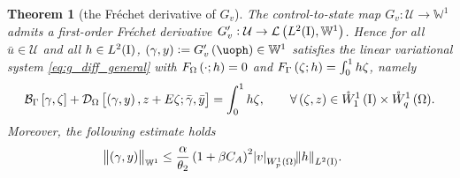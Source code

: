 \documentclass[final]{siamltex}
\newtheorem{thm}[theorem]{Theorem}
\begin{document}
\begin{thm}[the Fr\'echet derivative of $G_v$]\label{thm:g_diff_u} 
The control-to-state map $G_v:{\mathcal{U}} \to {\mathbb{W}}^1$ 
admits a first-order Fr\'echet derivative  
$G_v' : {\mathcal{U}} \rightarrow \mathcal{L}\del{L^2({\text{\rm I}}), {\mathbb{W}}^1}$. 
Hence for all ${\bar{u}} \in {\mathcal{U}}$ and 
all $h \in L^2({\text{\rm I}})$, $\del{\gamma, y} :=  G_v'\del\uoph \in {\mathbb{W}}^1$ satisfies the linear variational system \eqref{eq:g_diff_general} with $F_\Omega\del{\cdot;h} = 0$ and $F_\Gamma\del{\zeta;h} = \int_0^1 h \zeta$, namely
	\begin{equation} \label{eq:g_diff_u}
		{{\mathcal{B}}_\Gamma}\sbr{\gamma, \zeta} + {{\mathcal{D}}_\Omega}\sbr{\del{\gamma, y}, z+ E\zeta; {\bar{\gamma}}, {\bar{y}}} = \int_0^1 h \zeta, 
			\quad\quad \forall \del{\zeta, z} \in {{\mathring{W}^{1}_{1}\del{{\text{\rm I}}}}} \times {{\mathring{W}^{1}_{q}\del{\Omega}}}.
	\end{equation}
Moreover, the following estimate holds
	\begin{align}\label{eq:g_diff_u_estimate}
		\norm{\del{\gamma,y}}_{{\mathbb{W}}^1} 
			&\le \frac{\alpha}{\theta_2} \del{1+\beta C_A}^2{\abs{{v}}_{{W^{{1}}_{{p}}\del{{\Omega}}}}}{\norm{{h}}_{{L^2\del{{{\text{\rm I}}}}}}}.
	\end{align}
\end{thm}
\end{document}
